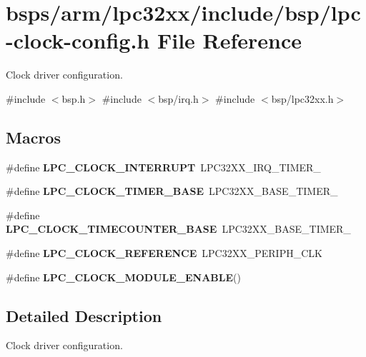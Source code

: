 \hypertarget{lpc32xx_2include_2bsp_2lpc-clock-config_8h}{}\section{bsps/arm/lpc32xx/include/bsp/lpc-\/clock-\/config.h File Reference}
\label{lpc32xx_2include_2bsp_2lpc-clock-config_8h}


Clock driver configuration.  


{\ttfamily \#include $<$bsp.\+h$>$}\newline
{\ttfamily \#include $<$bsp/irq.\+h$>$}\newline
{\ttfamily \#include $<$bsp/lpc32xx.\+h$>$}\newline
\subsection*{Macros}
\begin{DoxyCompactItemize}
\item 
\#define {\bfseries L\+P\+C\+\_\+\+C\+L\+O\+C\+K\+\_\+\+I\+N\+T\+E\+R\+R\+U\+PT}~L\+P\+C32\+X\+X\+\_\+\+I\+R\+Q\+\_\+\+T\+I\+M\+E\+R\+\_
\item 
\#define {\bfseries L\+P\+C\+\_\+\+C\+L\+O\+C\+K\+\_\+\+T\+I\+M\+E\+R\+\_\+\+B\+A\+SE}~L\+P\+C32\+X\+X\+\_\+\+B\+A\+S\+E\+\_\+\+T\+I\+M\+E\+R\+\_
\item 
\#define {\bfseries L\+P\+C\+\_\+\+C\+L\+O\+C\+K\+\_\+\+T\+I\+M\+E\+C\+O\+U\+N\+T\+E\+R\+\_\+\+B\+A\+SE}~L\+P\+C32\+X\+X\+\_\+\+B\+A\+S\+E\+\_\+\+T\+I\+M\+E\+R\+\_
\item 
\#define {\bfseries L\+P\+C\+\_\+\+C\+L\+O\+C\+K\+\_\+\+R\+E\+F\+E\+R\+E\+N\+CE}~L\+P\+C32\+X\+X\+\_\+\+P\+E\+R\+I\+P\+H\+\_\+\+C\+LK
\item 
\#define {\bfseries L\+P\+C\+\_\+\+C\+L\+O\+C\+K\+\_\+\+M\+O\+D\+U\+L\+E\+\_\+\+E\+N\+A\+B\+LE}()
\end{DoxyCompactItemize}


\subsection{Detailed Description}
Clock driver configuration. 

